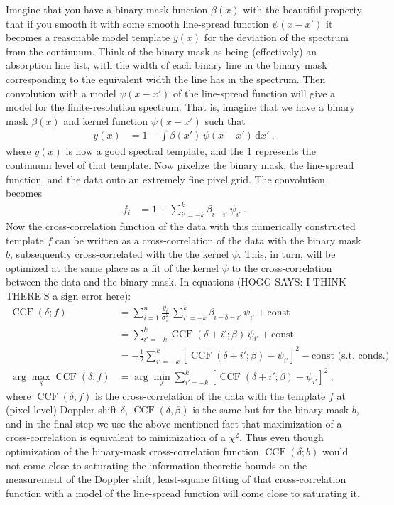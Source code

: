 \documentclass[modern]{aastex631}
\DeclareMathOperator{\CCF}{CCF}
\newcommand{\dd}{\mathrm{d}}
\begin{document}
Imagine that you have a binary mask function $\beta(x)$ with the beautiful property that if you smooth it with some smooth line-spread function $\psi(x-x')$ it becomes a reasonable model template $y(x)$ for the deviation of the spectrum from the continuum.
Think of the binary mask as being (effectively) an absorption line list, with the width of each binary line in the binary mask corresponding to the equivalent width the line has in the spectrum.
Then convolution with a model $\psi(x-x')$ of the line-spread function will give a model for the finite-resolution spectrum.
That is, imagine that we have a binary mask $\beta(x)$ and kernel function $\psi(x-x')$ such that
\begin{align}
    y(x) &= 1 - \int\beta(x')\,\psi(x-x')\,\dd x' ~,
\end{align}
where $y(x)$ is now a good spectral template, and the $1$ represents the continuum level of that template.
Now pixelize the binary mask, the line-spread function, and the data onto an extremely fine pixel grid.
The convolution becomes
\begin{align}
    f_i &= 1 + \sum_{i'=-k}^k \beta_{i-i'}\,\psi_{i'} ~.
\end{align}
Now the cross-correlation function of the data with this numerically constructed template $f$ can be written as a cross-correlation of the data with the binary mask $b$, subsequently cross-correlated with the the kernel $\psi$.
This, in turn, will be optimized at the same place as a fit of the kernel $\psi$ to the cross-correlation between the data and the binary mask.
In equations (HOGG SAYS: I THINK THERE'S a sign error here):
\begin{align}
    \CCF(\delta; f) &= \sum_{i=1}^n \frac{y_i}{\sigma_i^2}\,\sum_{i'=-k}^k \beta_{i-\delta-i'}\,\psi_{i'} + \text{const}\\
    &= \sum_{i'=-k}^k \CCF(\delta+i';\beta)\,\psi_{i'} + \text{const}\\
    &= -\frac{1}{2}\sum_{i'=-k}^k [\CCF(\delta+i';\beta) - \psi_{i'}]^2 - \text{const}\mbox{~(s.t. conds.)}\\
    \arg\max_{\delta} \CCF(\delta; f) &= \arg\min_{\delta} \sum_{i'=-k}^k [\CCF(\delta+i';\beta) - \psi_{i'}]^2 ~,
\end{align}
where $\CCF(\delta; f)$ is the cross-correlation of the data with the template $f$ at (pixel level) Doppler shift $\delta$,
$\CCF(\delta, \beta)$ is the same but for the binary mask $b$,
and in the final step we use the above-mentioned fact that maximization of a cross-correlation is equivalent to minimization of a $\chi^2$.
Thus even though optimization of the binary-mask cross-correlation function $\CCF(\delta; b)$ would not come close to saturating the information-theoretic bounds on the measurement of the Doppler shift, least-square fitting of that cross-correlation function with a model of the line-spread function will come close to saturating it.
\end{document}
